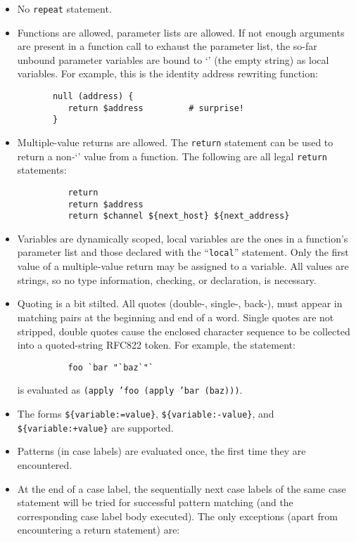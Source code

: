 \begin{itemize}
\item  No {\tt repeat} statement.
\item  Functions are allowed, parameter lists are allowed. If not enough
arguments are present in a function call to exhaust the parameter
list, the so-far unbound parameter variables are bound to `' (the
empty string) as local variables. For example, this is the identity
address rewriting function:
     
\begin{verbatim}
       null (address) {
          return $address         # surprise!
       }
\end{verbatim}

\item  Multiple-value returns are allowed.  The {\tt return} statement can be
used to return a non-`' value from a function.  The following are all
legal {\tt return} statements:
     
\begin{verbatim}
          return
          return $address
          return $channel ${next_host} ${next_address}
\end{verbatim}

\item  Variables are dynamically scoped, local variables are the 
ones in a function's parameter list and those declared with the 
``{\tt local}'' statement. Only the first value of a multiple-value return may 
be assigned to a variable.  All values are strings, so no type information, 
checking, or declaration, is  necessary.
\item  Quoting is a bit stilted. All quotes (double-, single-, back-), must 
appear in matching pairs at the beginning and end of a word.  Single 
quotes are not stripped, double quotes cause the enclosed character 
sequence to be collected into a quoted-string RFC822 token.  For 
example, the statement:

\begin{verbatim}
          foo `bar "`baz`"`
\end{verbatim}
     
is evaluated as {\tt (apply 'foo (apply 'bar (baz)))}.
\item  The forms {\tt \$\{variable:=value\}}, 
{\tt \$\{variable:-value\}}, and
{\tt \$\{variable:+value\}} are supported.  
\item  Patterns (in case labels) are evaluated once, the first time they are
encountered.
\item  At the end of a case label, the sequentially next case labels of the
same case statement will be tried for successful pattern matching (and
the corresponding case label body executed). The only exceptions
(apart from encountering a return statement) are:


\end{itemize}
